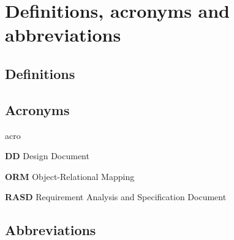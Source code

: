 
\section{Definitions, acronyms and abbreviations}

\subsection{Definitions}

\subsection{Acronyms}
	\begin{labeling}{acro}
		\item[\textbf{DD}] Design Document
		\item[\textbf{ORM}] Object-Relational Mapping
		\item[\textbf{RASD}] Requirement Analysis and Specification Document
	\end{labeling}

\subsection{Abbreviations}
